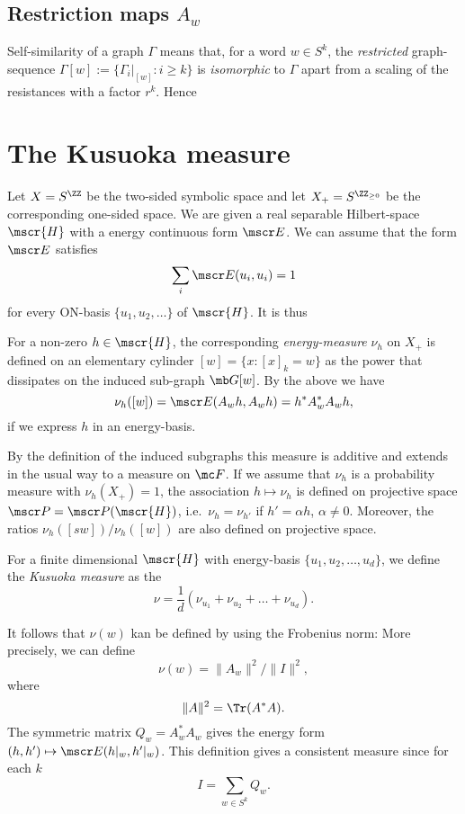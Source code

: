 \documentclass[11pt]{scrartcl}
\def\X{X}
\renewcommand{\T}{^*}
\renewcommand{\H}{\mscr{H}}
\theoremstyle{plain} %
\theoremstyle{definition}
\begin{document}
\subsection{Restriction maps $A_w$}
Self-similarity of a graph $\Gamma$ means that, for a word $w\in S^k$, the
\emph{restricted} graph-sequence $\Gamma[w] := \{ \Gamma_i\vert_{[w]} : i\geq
k \}$ is \emph{isomorphic} to $\Gamma$ apart from a scaling of the
resistances with a factor $r^k$. Hence 

\section{The Kusuoka measure}

Let $\X=S^\ZZ$ be the two-sided symbolic space and let
$\X_+=S^{\ZZ_{\geq0}}$ be the corresponding one-sided space.  We are
given a real separable Hilbert-space $\H$ with a energy continuous form $\mscr
E$. We can assume that the form $\mscr E$ satisfies 
$$ \sum_i \mscr E( u_i, u_i) = 1 $$
for every ON-basis $\{ u_1, u_2, \dots \}$ of $\H$. It is thus 


For a
non-zero $h\in \H$, the corresponding \emph{energy-measure }
$\nu_h$ on $\X_+$ is defined on an elementary cylinder 
$[w]=\{x:[x]_k=w\}$
as the power that dissipates on the induced sub-graph $\mb G[w]$. By
the above we have 
$$ \nu_h([w]) = \mscr E ( A_w h, A_w h) = h\T A_w\T A_w h, $$ 
if we express $h$ in an energy-basis. 

By the definition of the induced subgraphs this measure is additive and
extends in the usual way to a measure on $\mc F$. If we
assume that $\nu_h$ is a probability measure with $\nu_h(X_+)=1$, 
the association $h\mapsto \nu_{h}$ is defined on projective space
$\mscr P = \mscr P(\H)$, i.e.\ $\nu_h=\nu_{h'}$ if $h'=\alpha h$,
$\alpha\not=0$. Moreover, the ratios $\nu_h([sw])/\nu_h([w])$ are also
defined on projective space. 

For a finite dimensional $\H$ with
energy-basis $\{u_1,u_2,\dots,u_d\}$, we define the
\emph{Kusuoka measure} as the 
$$\nu = \frac 1d \left(\nu_{u_1} + \nu_{u_2} + \dots + \nu_{u_d}\right).$$

It follows that $\nu(w)$ kan be defined by using the Frobenius norm:
More precisely, we can define  
\begin{equation}
\nu(w) = \|A_w\|^2 \big/ \| I \|^2,\label{kusuokadef}
\end{equation}
where 
$$ \| A \|^2 = \Tr( A^* A ). $$
The symmetric matrix $Q_w=A^*_w A_w$ gives the energy
form $(h,h') \mapsto \mscr E(h\vert_w,h'\vert_w)$.  This definition
gives a consistent measure since for each $k$
$$ I = \sum_{w\in S^k} Q_w. $$
\end{document}

